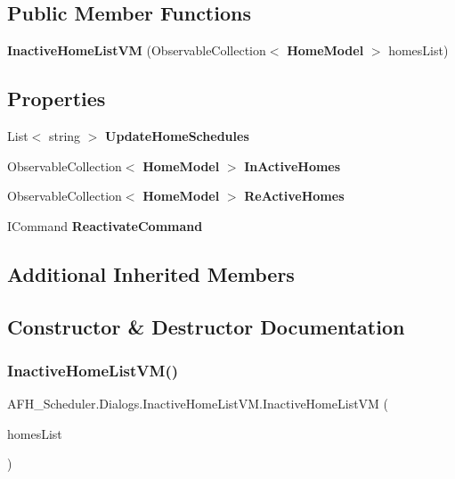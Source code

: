 \subsection*{Public Member Functions}
\begin{DoxyCompactItemize}
\item 
\textbf{ Inactive\+Home\+List\+VM} (Observable\+Collection$<$ \textbf{ Home\+Model} $>$ homes\+List)
\end{DoxyCompactItemize}
\subsection*{Properties}
\begin{DoxyCompactItemize}
\item 
List$<$ string $>$ \textbf{ Update\+Home\+Schedules}\hspace{0.3cm}{\ttfamily  [get, set]}
\item 
Observable\+Collection$<$ \textbf{ Home\+Model} $>$ \textbf{ In\+Active\+Homes}\hspace{0.3cm}{\ttfamily  [get, set]}
\item 
Observable\+Collection$<$ \textbf{ Home\+Model} $>$ \textbf{ Re\+Active\+Homes}\hspace{0.3cm}{\ttfamily  [get, set]}
\item 
I\+Command \textbf{ Reactivate\+Command}\hspace{0.3cm}{\ttfamily  [get]}
\end{DoxyCompactItemize}
\subsection*{Additional Inherited Members}


\subsection{Constructor \& Destructor Documentation}
\mbox{\label{class_a_f_h___scheduler_1_1_dialogs_1_1_inactive_home_list_v_m_a6b8da1c902cb7f135314436b427563a7}} 
\subsubsection{InactiveHomeListVM()}
{\footnotesize\ttfamily A\+F\+H\+\_\+\+Scheduler.\+Dialogs.\+Inactive\+Home\+List\+V\+M.\+Inactive\+Home\+List\+VM (\begin{DoxyParamCaption}\item[{Observable\+Collection$<$ \textbf{ Home\+Model} $>$}]{homes\+List }\end{DoxyParamCaption})}



